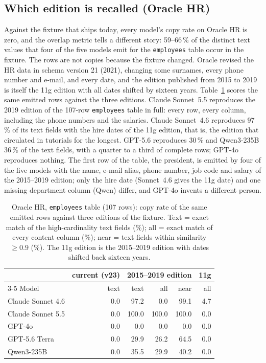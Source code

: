 \documentclass[preprint,12pt]{elsarticle}
\begin{document}
\subsection{Which edition is recalled (Oracle HR)}
\label{sec:editions}
Against the fixture that ships today, every model's copy rate on Oracle HR is zero, and the overlap metric tells a different story: 59--66\,\% of the distinct text values that four of the five models emit for the \texttt{employees} table occur in the fixture. The rows are not copies because the fixture changed. Oracle revised the HR data in schema version 21 (2021), changing some surnames, every phone number and e-mail, and every date, and the edition published from 2015 to 2019 is itself the 11g edition with all dates shifted by sixteen years. Table~\ref{tab:editions} scores the same emitted rows against the three editions. Claude Sonnet~5.5 reproduces the 2019 edition of the 107-row \texttt{employees} table in full: every row, every column, including the phone numbers and the salaries. Claude Sonnet~4.6 reproduces 97\,\% of its text fields with the hire dates of the 11g edition, that is, the edition that circulated in tutorials for the longest. GPT-5.6 reproduces 30\,\% and Qwen3-235B 36\,\% of the text fields, with a quarter to a third of complete rows; GPT-4o reproduces nothing. The first row of the table, the president, is emitted by four of the five models with the name, e-mail alias, phone number, job code and salary of the 2015--2019 edition; only the hire date (Sonnet~4.6 gives the 11g date) and one missing department column (Qwen) differ, and GPT-4o invents a different person.

\begin{table}[t]
\centering\small
\caption{Oracle HR, \texttt{employees} table (107 rows): copy rate of the same emitted rows against three editions of the fixture. Text = exact match of the high-cardinality text fields (\%); all = exact match of every content column (\%); near = text fields within similarity $\geq 0.9$ (\%). The 11g edition is the 2015--2019 edition with dates shifted back sixteen years.}
\label{tab:editions}
\begin{tabular}{lrrrrr}
\toprule
 & current (v23) & \multicolumn{3}{c}{2015--2019 edition} & 11g \\
\cmidrule(lr){3-5}
Model & text & text & all & near & all \\
\midrule
Claude Sonnet 4.6 & 0.0 & 97.2 & 0.0 & 99.1 & 4.7 \\
Claude Sonnet 5.5 & 0.0 & 100.0 & 100.0 & 100.0 & 0.0 \\
GPT-4o & 0.0 & 0.0 & 0.0 & 0.0 & 0.0 \\
GPT-5.6 Terra & 0.0 & 29.9 & 26.2 & 64.5 & 0.0 \\
Qwen3-235B & 0.0 & 35.5 & 29.9 & 40.2 & 0.0 \\
\bottomrule
\end{tabular}
\end{table}
\end{document}
